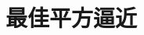 \documentclass[../../main.tex]{subfiles}%
\begin{document}
\section{最佳平方逼近}

\begin{definition}

\end{definition}
\end{document}
